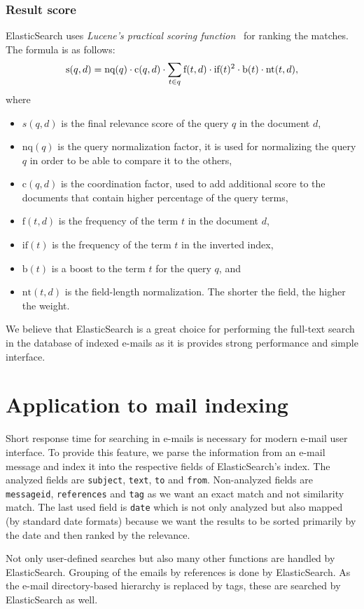 \subsubsection{Result score}
ElasticSearch uses \emph{Lucene's practical scoring function}~\cite{elastic} for ranking the matches.
The formula is as follows:
\begin{align*}
\centering
\textrm{s}(q,d) = \textrm{nq}(q) \cdot \textrm{c}(q,d) \cdot \sum_{t \in q}\textrm{f}(t,d) \cdot \textrm{if}(t)^2 \cdot\textrm{b}(t) \cdot \textrm{nt}(t,d),
\end{align*}
where
\begin{itemize}
\item $s(q,d)$ is the final relevance score of the query $q$ in the document $d$,
\item $\textrm{nq}(q)$ is the query normalization factor, it is used for normalizing the query $q$ in order to be able to compare it to the others,
\item $\textrm{c}(q,d)$ is the coordination factor, used to add additional score to the documents that contain higher percentage of the query terms,
\item $\textrm{f}(t,d)$ is the frequency of the term $t$ in the document $d$,
\item $\textrm{if}(t)$ is the frequency of the term $t$ in the inverted index,
\item $\textrm{b}(t)$ is a boost to the term $t$ for the query $q$, and
\item $\textrm{nt}(t,d)$ is the field-length normalization. The shorter the field, the higher the weight.
\end{itemize}

We believe that ElasticSearch is a great choice for performing the full-text search in the database of indexed e-mails as it is provides strong performance and simple interface.

\section{Application to mail indexing}
Short response time for searching in e-mails is necessary for modern e-mail user interface. 
To provide this feature, we parse the information from an e-mail message and index it into the respective fields of ElasticSearch's index. The analyzed fields are \texttt{subject}, \texttt{text}, \texttt{to} and \texttt{from}. Non-analyzed fields are \texttt{messageid}, \texttt{references} and \texttt{tag} as we want an exact match and not similarity match. The last used field is \texttt{date} which is not only analyzed but also mapped (by standard date formats) because we want the results to be sorted primarily by the date and then ranked by the relevance.

Not only user-defined searches but also many other functions are handled by ElasticSearch. Grouping of the emails by references is done by ElasticSearch. As the e-mail directory-based hierarchy is replaced by tags, these are searched by ElasticSearch as well.
